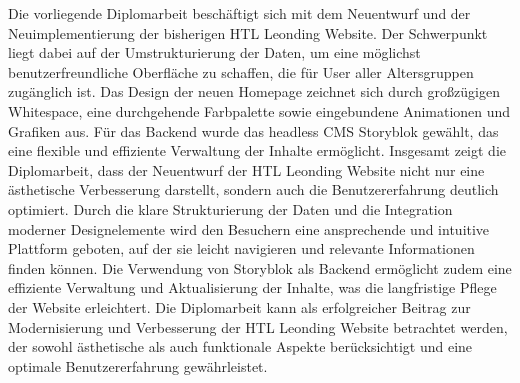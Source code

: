 Die vorliegende Diplomarbeit beschäftigt sich mit dem Neuentwurf und der Neuimplementierung der bisherigen HTL Leonding Website. 
Der Schwerpunkt liegt dabei auf der Umstrukturierung der Daten, um eine möglichst benutzerfreundliche Oberfläche zu schaffen, die für 
User aller Altersgruppen zugänglich ist. Das Design der neuen Homepage zeichnet sich durch großzügigen Whitespace, eine durchgehende 
Farbpalette sowie eingebundene Animationen und Grafiken aus. Für das Backend wurde das headless CMS Storyblok gewählt, das eine flexible 
und effiziente Verwaltung der Inhalte ermöglicht.
Insgesamt zeigt die Diplomarbeit, dass der Neuentwurf der HTL Leonding Website nicht nur eine ästhetische Verbesserung darstellt, sondern 
auch die Benutzererfahrung deutlich optimiert. Durch die klare Strukturierung der Daten und die Integration moderner Designelemente wird 
den Besuchern eine ansprechende und intuitive Plattform geboten, auf der sie leicht navigieren und relevante Informationen finden können.
Die Verwendung von Storyblok als Backend ermöglicht zudem eine effiziente Verwaltung und Aktualisierung der Inhalte, was die langfristige Pflege der Website erleichtert.
Die Diplomarbeit kann als erfolgreicher Beitrag zur Modernisierung und Verbesserung der HTL Leonding Website betrachtet werden, 
der sowohl ästhetische als auch funktionale Aspekte berücksichtigt und eine optimale Benutzererfahrung gewährleistet.